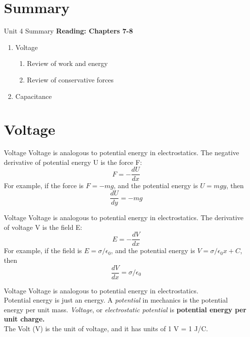 \documentclass{beamer}
\begin{document}
\section{Summary}

\begin{frame}{Unit 4 Summary}
\textbf{Reading: Chapters 7-8}
\begin{enumerate}
\item Voltage
\begin{enumerate}
\item Review of work and energy
\item Review of conservative forces
\end{enumerate}
\item Capacitance
\end{enumerate}
\end{frame}

\section{Voltage}

\begin{frame}{Voltage}
\alert{Voltage} is analogous to potential energy in electrostatics.  The negative derivative of potential energy U is the force F:
\begin{equation}
F = -\frac{dU}{dx}
\end{equation}
For example, if the force is $F = -mg$, and the potential energy is $U = mgy$, then 
\begin{equation}
\frac{dU}{dy} = -mg
\end{equation}
\end{frame}

\begin{frame}{Voltage}
\alert{Voltage} is analogous to potential energy in electrostatics.  The derivative of voltage V is the field E:
\begin{equation}
E = -\frac{dV}{dx}
\end{equation}
For example, if the field is $E = \sigma/\epsilon_0$, and the potential energy is $V = \sigma/\epsilon_0 x + C$, then 
\begin{equation}
\frac{dV}{dx} = \sigma/\epsilon_0
\end{equation}
\end{frame}

\begin{frame}{Voltage}
\alert{Voltage} is analogous to potential energy in electrostatics. \\ \vspace{1cm}
Potential energy is just an energy.  A \textit{potential} in mechanics is the potential energy per unit mass.  \textit{Voltage}, or \textit{electrostatic potential} is \textbf{\alert{potential energy per unit charge.}} \\ \vspace{0.5cm}
The Volt (V) is the unit of voltage, and it has units of 1 V = 1 J/C.
\end{frame}
\end{document}
